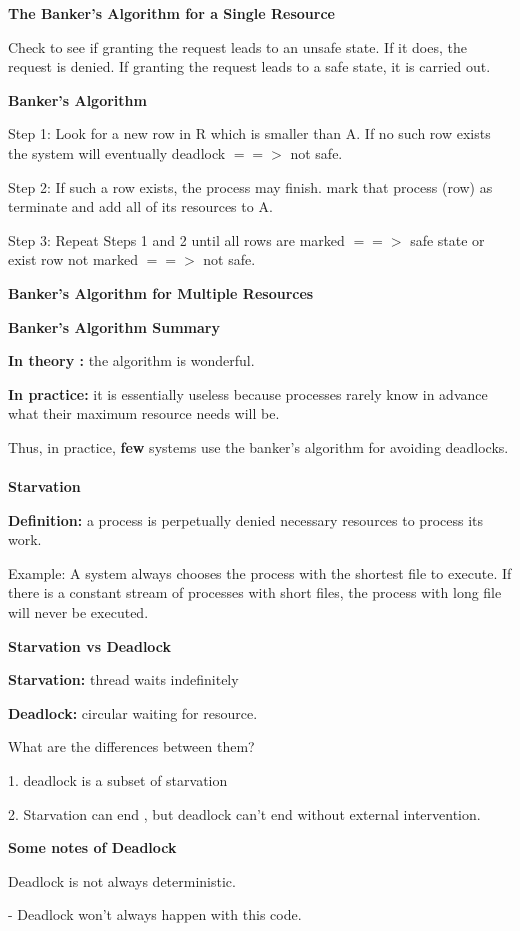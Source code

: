 \documentclass[]{report}
\begin{document}
\textbf{The Banker's Algorithm for a Single Resource}

Check to see if granting the request leads to an unsafe
state. If it does, the request is denied. If granting the
request leads to a safe state, it is carried out.

\textbf{Banker’s Algorithm}

Step 1: Look for a new row in R which is smaller than
A. If no such row exists the system will eventually
deadlock $== >$ not safe.

Step 2: If such a row exists, the process may finish.
mark that process (row) as terminate and add all of its
resources to A.

Step 3: Repeat Steps 1 and 2 until all rows are
marked $== >$ safe state
or exist row not marked $== >$ not safe.

\textbf{Banker's Algorithm for Multiple Resources}

\textbf{Banker's Algorithm Summary}

\textbf{In theory :} the algorithm is wonderful.

\textbf{In practice:} it is essentially useless
because processes rarely know in
advance what their maximum resource
needs will be.

Thus, in practice, \textbf{few} systems use the
banker’s
algorithm
for
avoiding
deadlocks.\\\\
\textbf{Starvation}

\textbf{Definition:} a process is perpetually denied
necessary resources to process its work.

Example: A system always chooses the process with
the shortest file to execute. If there is a constant
stream of processes with short files, the process with
long file will never be executed.

\textbf{Starvation vs Deadlock}

\textbf{Starvation:} thread waits indefinitely

\textbf{Deadlock:} circular waiting for resource.

What are the differences between them?

1. deadlock is a subset of starvation

2. Starvation can end , but deadlock
can’t
end
without
external
intervention.

\textbf{Some notes of Deadlock}

Deadlock is not always deterministic.

- Deadlock won’t always happen with this code.
\end{document}
